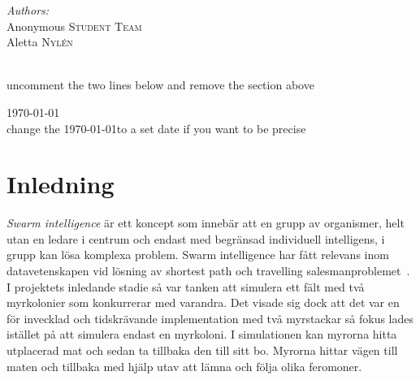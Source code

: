 \documentclass[12pt]{article}
\begin{document}
\begin{titlepage}

\begin{minipage}{0.6\textwidth}
\begin{flushleft} \large
\emph{Authors:}\\
Anonymous \textsc{Student Team}\\ %
Aletta \textsc{Nylén}\\ %
\end{flushleft}

\end{minipage}\\[2cm]

uncomment the two lines below and remove the section above


{\large \today}\\[2cm] %
change the \today to a set date if you want to be precise

\vfill %

\end{titlepage}
\section{Inledning}
\textit{Swarm intelligence} är ett koncept som innebär att en grupp av organismer,
helt utan en ledare i centrum och endast med begränsad individuell intelligens,
i grupp kan lösa komplexa problem.
Swarm intelligence har fått relevans inom datavetenskapen vid lösning av shortest path och travelling salesmanproblemet~\cite{dorigo1997ant}.
I projektets inledande stadie så var tanken att simulera ett fält med två myrkolonier som konkurrerar med varandra.
Det visade sig dock att det var en för invecklad och tidskrävande implementation med två myrstackar så fokus lades istället på att simulera endast en myrkoloni.
I simulationen kan myrorna hitta utplacerad mat och sedan ta tillbaka den till sitt bo.
Myrorna hittar vägen till maten och tillbaka med hjälp utav att lämna och följa olika feromoner.
\end{document}

